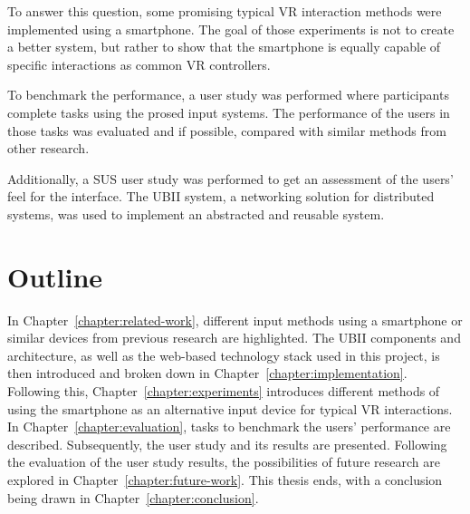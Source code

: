 To answer this question, some promising typical \gls{VR} interaction methods were implemented using a smartphone. The goal of those experiments is not to create a better system, but rather to show that the smartphone is equally capable of specific interactions as common \gls{VR} controllers.

To benchmark the performance, a user study was performed where participants complete tasks using the prosed input systems.
The performance of the users in those tasks was evaluated and if possible, compared with similar methods from other research.

Additionally, a \gls{SUS} user study was performed to get an assessment of the users' feel for the interface.
The \gls{UBII} system, a networking solution for distributed systems, was used to implement an abstracted and reusable system.


\section{Outline}\label{section:outline}
In Chapter~\ref{chapter:related-work}, different input methods using a smartphone or similar devices from previous research are highlighted. The \gls{UBII} components and architecture, as well as the web-based technology stack used in this project, is then introduced and broken down in Chapter~\ref{chapter:implementation}. Following this, Chapter~\ref{chapter:experiments} introduces different methods of using the smartphone as an alternative input device for typical \gls{VR} interactions. In Chapter~\ref{chapter:evaluation}, tasks to benchmark the users' performance are described. Subsequently, the user study and its results are presented. Following the evaluation of the user study results, the possibilities of future research are explored in Chapter~\ref{chapter:future-work}. This thesis ends, with a conclusion being drawn in Chapter~\ref{chapter:conclusion}.